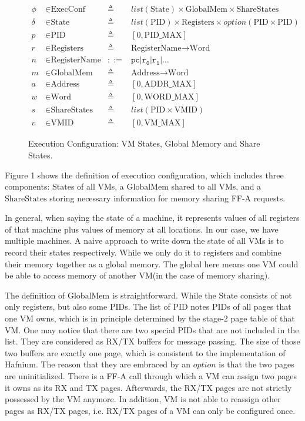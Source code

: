 \documentclass[a4paper]{article}
\newcommand*{\defined}{\triangleq}
\newcommand*{\maps}{\rightarrow}
\newcommand*{\derived}{::=}
\newcommand*{\CONF}{\text{ExecConf}}
\newcommand*{\STATE}{\text{State}}
\newcommand*{\MEM}{\text{GlobalMem}}
\newcommand*{\SSS}{\text{ShareStates}}
\newcommand*{\PID}{\text{PID}}
\newcommand*{\REGS}{\text{Registers}}
\newcommand*{\ADDR}{\text{Address}}
\newcommand*{\WORD}{\text{Word}}
\newcommand*{\VMID}{\text{VMID}}
\newcommand*{\REGNAMES}{\text{RegisterName}}
\newcommand*{\PAMAX}{\text{ADDR\_MAX}}
\newcommand*{\PPIDMAX}{\text{PID\_MAX}}
\newcommand*{\PWMAX}{\text{WORD\_MAX}}
\newcommand*{\PVMMAX}{\text{VM\_MAX}}
\begin{document}
\begin{figure}
\begin{align*}
  \phi &\in \CONF &\defined &list(\STATE) \times \MEM \times \SSS \\
  \delta &\in \STATE &\defined &list(\PID) \times \REGS \times option(\PID \times \PID) \\
  p & \in \PID &\defined  &[ 0, \PPIDMAX ] \\
  r & \in \REGS &\defined  &\REGNAMES \maps \WORD \\
  n & \in \REGNAMES &\derived  &\mathtt{pc} | \mathtt {r_{0}} | \mathtt{r_{1}} | \dots \\
  m & \in \MEM &\defined  &\ADDR \maps \WORD \\
  a & \in \ADDR &\defined  &[ 0, \PAMAX ] \\
  w & \in \WORD &\defined  &[ 0, \PWMAX ] \\
  s & \in \SSS &\defined  &list(\PID \times \VMID) \\
  v & \in \VMID &\defined  &[ 0, \PVMMAX ]
\end{align*}
\caption{Execution Configuration: VM States, Global Memory and Share States.}
\end{figure}
Figure 1 shows the definition of execution configuration, which includes three components: $\STATE$s of all VMs, a $\MEM$ shared to all VMs, and a $\SSS$ storing necessary information for memory sharing FF-A requests.

In general, when saying the state of a machine, it represents values of all registers of that machine plus values of memory at all locations. In our case, we have multiple machines. A naive approach to write down the state of all VMs is to record their states respectively. While we only do it to registers and combine their memory together as a global memory. The global here means one VM could be able to access memory of another VM(in the case of memory sharing).

The definition of $\MEM$ is straightforward.  While the $\STATE$ consists of not only registers, but also some $\PID$s. The list of $\PID$ notes $\PID$s of all pages that one VM owns, which is in principle determined by the stage-2 page table of that VM. One may notice that there are two special $\PID$s that are not included in the list. They are considered as RX/TX buffers for message passing. The size of those two buffers are exactly one page, which is consistent to the implementation of Hafnium. The reason that they are embraced by an $option$ is that the two pages are uninitialized. There is a FF-A call through which a VM can assign two pages it owns as its RX and TX pages.   Afterwards, the RX/TX pages are not strictly possessed by the VM anymore. In addition, VM is not able to reassign other pages as RX/TX pages, i.e. RX/TX pages of a VM can only be configured once.
\end{document}
